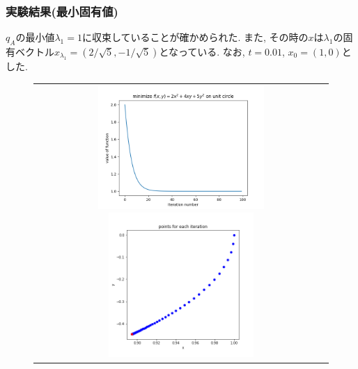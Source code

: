 \documentclass[dvipdfmx,11pt]{beamer}		%
\begin{document}
    \begin{frame}
        \frametitle{実験結果(最小固有値)}
        $q_{A}$の最小値$\lambda_1 = 1$に収束していることが確かめられた. 
        また, その時の$x$は$\lambda_1$の固有ベクトル$x_{\lambda_1} = (2/\sqrt{5}, -1/\sqrt{5})$となっている. なお, $t = 0.01$, $x_{0} = (1, 0)$とした. 
        \begin{figure}[b]
            \begin{tabular}{c}
                \begin{minipage}{0.55\hsize}
                    \centering
                    \includegraphics[width = 6.3cm]{Images/result_min.png}
                \end{minipage}
                \begin{minipage}{0.45\hsize}
                    \centering
                    \includegraphics[width = 5.5cm]{Images/eign_vec_min.png}
                \end{minipage}
            \end{tabular}   
        \end{figure}  
    \end{frame}
\end{document}
